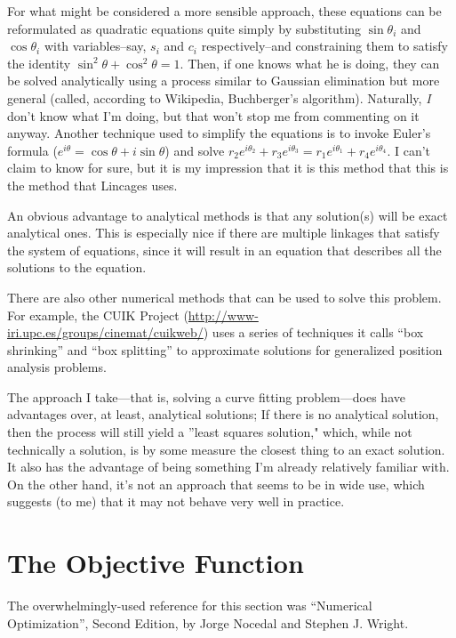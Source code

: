 \documentclass[12pt, letterpaper]{article}
\begin{document}
For what might be considered a more sensible approach, these equations can be reformulated as quadratic equations quite simply by substituting \(\sin\theta_i\) and \(\cos\theta_i\) with variables--say, \(s_i\) and \(c_i\) respectively--and constraining them to satisfy the identity \(\sin^2\theta + \cos^2\theta = 1\). Then, if one knows what he is doing, they can be solved analytically using a process similar to Gaussian elimination but more general (called, according to Wikipedia, Buchberger's algorithm). Naturally, \emph{I} don't know what I'm doing, but that won't stop me from commenting on it anyway. Another technique used to simplify the equations is to invoke Euler's formula (\(e^{i\theta}=\cos\theta + i\sin\theta\)) and solve \(r_2e^{i\theta_2}+r_3e^{i\theta_3}=r_1e^{i\theta_1}+r_4e^{i\theta_4}\). I can't claim to know for sure, but it is my impression that it is this method that this is the method that Lincages uses.

An obvious advantage to analytical methods is that any solution(s) will be exact analytical ones.  This is especially nice if there are multiple linkages that satisfy the system of equations, since it will result in an equation that describes all the solutions to the equation.

There are also other numerical methods that can be used to solve this problem. For example, the CUIK Project (\url{http://www-iri.upc.es/groups/cinemat/cuikweb/}) uses a series of techniques it calls ``box shrinking'' and ``box splitting'' to approximate solutions for generalized position analysis problems.

The approach I take---that is, solving a curve fitting problem---does have advantages over, at least, analytical solutions; If there is no analytical solution, then the process will still yield a ''least squares solution," which, while not technically a solution, is by some measure the closest thing to an exact solution. It also has the advantage of being something I'm already relatively familiar with. On the other hand, it's not an approach that seems to be in wide use, which suggests (to me) that it may not behave very well in practice.

\section*{The Objective Function}

The overwhelmingly-used reference for this section was ``Numerical Optimization'', Second Edition, by Jorge Nocedal and Stephen J. Wright.
\end{document}
